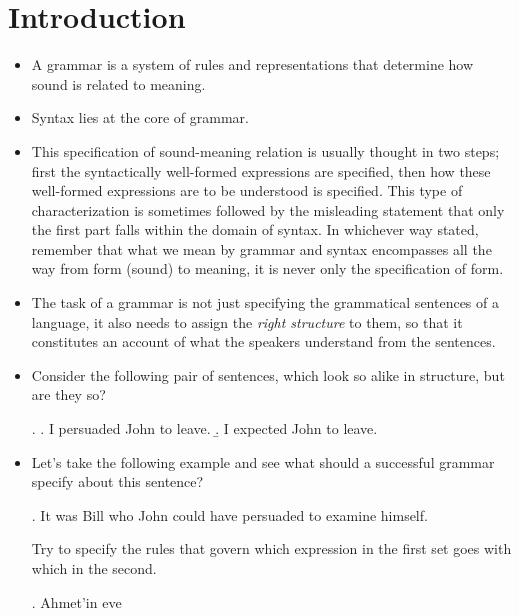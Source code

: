 \documentclass[11pt]{article}
\begin{document}
 \section{Introduction}
\begin{itemize}
\item A grammar is a system of rules and representations that determine
how sound is related to meaning. 

\item Syntax lies at the core of grammar.

\item This specification of sound-meaning relation is usually thought in two
steps; first the syntactically well-formed expressions are specified, then how
these well-formed expressions are to be understood is specified. This type of
characterization is sometimes followed by the misleading statement that only the
first part falls within the domain of syntax. In whichever
way stated, remember that what we mean by grammar and syntax encompasses all the
way from form (sound) to meaning, it is never only the specification of form.

\item  The task of a grammar is not just specifying the grammatical sentences
of a language, it also needs to assign the \emph{right structure} to them, so that it
constitutes an account of what the speakers understand from the sentences. 

\item Consider the following pair of sentences, which look so alike in structure, but are
they so?


\ex. 
\a. I persuaded John to leave.
\b. I expected John to leave.


\item Let's take the following example and see what should a successful grammar
specify about this sentence?

\ex.  It was Bill who John could have persuaded to examine himself.

\begin{uexercise}

Try to specify the rules that govern which expression in the first set goes with
which in the second.


\ex. Ahmet'in eve  


\end{uexercise}

\end{itemize} 
\end{document}
